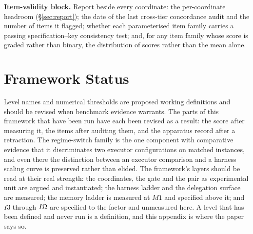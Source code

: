 \noindent\textbf{Item-validity block.} Report beside every coordinate: the per-coordinate headroom (\S\ref{sec:report}); the date of the last cross-tier concordance audit and the number of items it flagged; whether each parameterised item family carries a passing specification--key consistency test; and, for any item family whose score is graded rather than binary, the distribution of scores rather than the mean alone.

\section{Framework Status}

Level names and numerical thresholds are proposed working definitions and should be revised when benchmark evidence warrants. The parts of this framework that have been run have each been revised as a result: the score after measuring it, the items after auditing them, and the apparatus record after a retraction. The regime-switch family is the one component with comparative evidence that it discriminates two executor configurations on matched instances, and even there the distinction between an executor comparison and a harness scaling curve is preserved rather than elided. The framework's layers should be read at their real strength: the coordinates, the gate and the pair as experimental unit are argued and instantiated; the harness ladder and the delegation surface are measured; the memory ladder is measured at $M1$ and specified above it; and $I3$ through $I\Omega{}$ are specified to the factor and unmeasured here. A level that has been defined and never run is a definition, and this appendix is where the paper says so.



